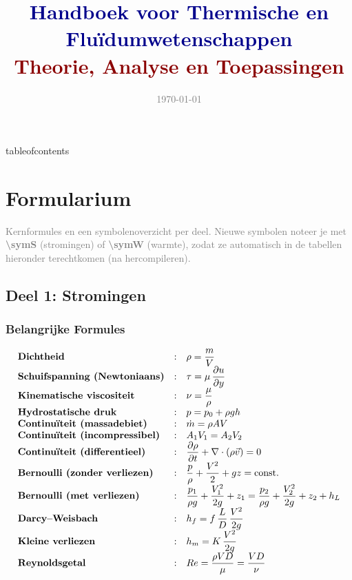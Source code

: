\documentclass[a4paper,11pt,twoside]{report}
\title{{\LARGE\textcolor{darkblue}{\textbf{Handboek voor Thermische en Fluïdumwetenschappen}}} \\ \large \textcolor{darkred}{Theorie, Analyse en Toepassingen}}
\author{}
\date{\textcolor{gray}{\today}}
\newcommand{\term}[1]{\textbf{#1}}
\begin{document}
{\let\newpage\relax\maketitle}

\begingroup
\hypersetup{linkcolor=darkblue}
\csname tableofcontents\endcsname
\endgroup

\chapter*{Formularium}



\vspace{-1em}
{\small \textcolor{gray}{Kernformules en een symbolenoverzicht per deel. Nieuwe symbolen noteer je met \term{\textbackslash symS} (stromingen) of \term{\textbackslash symW} (warmte), zodat ze automatisch in de tabellen hieronder terechtkomen (na hercompileren).}}\vspace{0.8em}

\section*{Deel 1: Stromingen}
\subsection*{Belangrijke Formules}
\begingroup
\setlength{\tabcolsep}{6pt}
\renewcommand{\arraystretch}{1.35}
\[
\begin{array}{@{}lcl@{}}
    	\textbf{Dichtheid} &:& \rho=\dfrac{m}{V}\\
    	\textbf{Schuifspanning (Newtoniaans)} &:& \tau=\mu\,\dfrac{\partial u}{\partial y}\\
    	\textbf{Kinematische viscositeit} &:& \nu=\dfrac{\mu}{\rho}\\
    	\textbf{Hydrostatische druk} &:& p=p_0+\rho g h\\
    	\textbf{Continu\"iteit (massadebiet)} &:& \dot{m}=\rho A V\\
    	\textbf{Continu\"iteit (incompressibel)} &:& A_1V_1=A_2V_2\\
        		\textbf{Continu\"iteit (differentieel)} &:& \dfrac{\partial \rho}{\partial t}+\nabla\cdot(\rho\vec{v})=0\\
    	\textbf{Bernoulli (zonder verliezen)} &:& \dfrac{p}{\rho}+\dfrac{V^2}{2}+gz=\text{const.}\\
        		\textbf{Bernoulli (met verliezen)} &:& \dfrac{p_1}{\rho g}+\dfrac{V_1^2}{2g}+z_1=\dfrac{p_2}{\rho g}+\dfrac{V_2^2}{2g}+z_2+h_L\\
        		\textbf{Darcy--Weisbach} &:& h_f=f\,\dfrac{L}{D}\,\dfrac{V^2}{2g}\\
        		\textbf{Kleine verliezen} &:& h_m=K\,\dfrac{V^2}{2g}\\
    	\textbf{Reynoldsgetal} &:& Re=\dfrac{\rho V D}{\mu}=\dfrac{V D}{\nu}\\
\end{array}
\]
\endgroup
\end{document}
